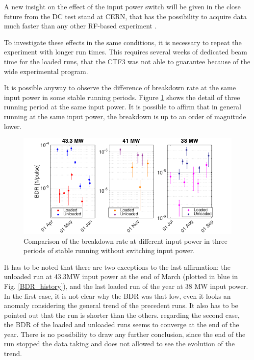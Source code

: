 A new insight on the effect of the input power switch will be given in the close future from the DC test stand at CERN, that has the possibility to acquire data much faster than any other RF-based experiment \cite{Walter:PC}.

To investigate these effects in the same conditions, it is necessary to repeat the experiment with longer run times. This requires several weeks of dedicated beam time for the loaded runs, that the CTF3 was not able to guarantee because of the wide experimental program.

It is possible anyway to observe the difference of breakdown rate at the same input power in some stable running periods. Figure \ref{BD_prob} shows the detail of three running period at the same input power. It is possible to affirm that in general running at the same input power, the breakdown is up to an order of magnitude lower. 


\begin{figure}[h]
\centering 
\includegraphics[scale=0.6]{pictures/BDR_zooms.png}
\caption{Comparison of the breakdown rate at different input power in three periods of stable running without switching input power.}
\label{BD_prob}
\end{figure}

It has to be noted that there are two exceptions to the last affirmation: the unloaded run at 43.3MW input power at the end of March (plotted in blue in Fig. \ref{BDR_history}), and the last loaded run of the year at 38 MW input power. In the first case, it is not clear why the BDR was that low, even it looks an anomaly considering the general trend of the precedent runs. It also has to be pointed out that the run is shorter than the others. regarding the second case, the BDR of the loaded and unloaded runs seems to converge at the end of the year. There is no possibility to draw any further conclusion, since the end of the run stopped the data taking and does not allowed to see the evolution of the trend.

